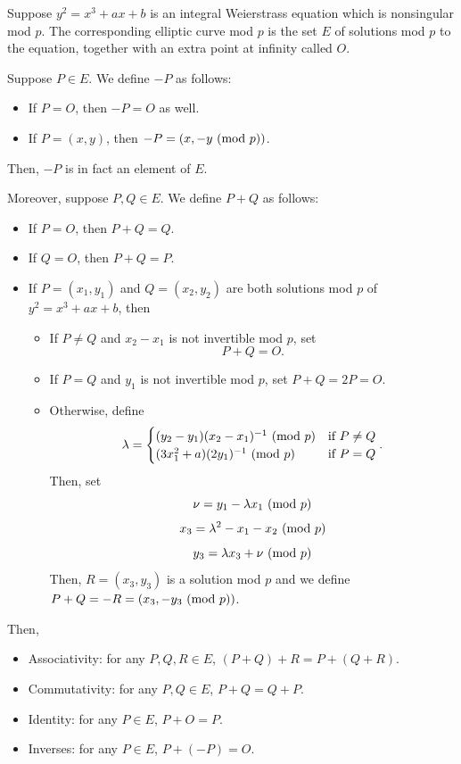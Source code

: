 \documentclass[letterpaper]{article}
\begin{document}
\begin{theorem}{}{}
    Suppose $y^2 = x^3 + ax + b$ is an integral Weierstrass equation which is nonsingular mod $p$. The corresponding elliptic curve mod $p$ is the set $E$ of solutions mod $p$ to the equation, together with an extra point at infinity called $O$. 

    \bigskip 

    Suppose $P \in E$. We define $-P$ as follows: 
    \begin{itemize}
        \item If $P = O$, then $-P = O$ as well.
        \item If $P = (x, y)$, then $-P = (x, -y \ (\mathrm{mod}\ p))$. 
    \end{itemize}
    Then, $-P$ is in fact an element of $E$. 

    \bigskip 

    Moreover, suppose $P, Q \in E$. We define $P + Q$ as follows: 
    \begin{itemize}
        \item If $P = O$, then $P + Q = Q$. 
        \item If $Q = O$, then $P + Q = P$. 
        \item If $P = (x_1, y_1)$ and $Q = (x_2, y_2)$ are both solutions mod $p$ of $y^2 = x^3 + ax + b$, then 
        \begin{itemize}
            \item If $P \neq Q$ and $x_2 - x_1$ is not invertible mod $p$, set \[P + Q = O.\]
            \item If $P = Q$ and $y_1$ is not invertible mod $p$, set $P + Q = 2P = O$. 
            \item Otherwise, define 
            \[\lambda = \begin{cases}
                (y_2 - y_1)(x_2 - x_1)^{-1} \ (\mathrm{mod}\ p) & \text{if } P \neq Q \\ 
                (3x_1^2 + a)(2y_1)^{-1} \ (\mathrm{mod}\ p) & \text{if } P = Q 
            \end{cases}.\]
            Then, set 
            \[\nu = y_1 - \lambda x_1 \ (\mathrm{mod}\ p)\]
            \[x_3 = \lambda^2 - x_1 - x_2 \ (\mathrm{mod}\ p)\]
            \[y_3 = \lambda x_3 + \nu \ (\mathrm{mod}\ p)\]
            Then, $R = (x_3, y_3)$ is a solution mod $p$ and we define $P + Q = -R = (x_3, -y_3 \ (\mathrm{mod}\ p))$. 
        \end{itemize}
    \end{itemize}
    Then, 
    \begin{itemize}
        \item Associativity: for any $P, Q, R \in E$, $(P + Q) + R = P + (Q + R)$.
        \item Commutativity: for any $P, Q \in E$, $P + Q = Q + P.$
        \item Identity: for any $P \in E$, $P + O = P.$
        \item Inverses: for any $P \in E$, $P + (-P) = O.$
    \end{itemize}
\end{theorem}
\end{document}
